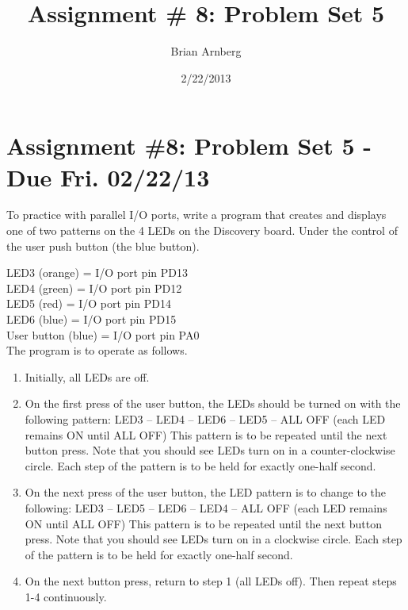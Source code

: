 \documentclass{article}
\title{Assignment \# 8: Problem Set 5}
\date{2/22/2013}
\author{Brian Arnberg}
\begin{document}
\label{start}



\section*{Assignment \#8: Problem Set 5 - Due Fri. 02/22/13}

To practice with parallel I/O ports, write a program that creates and displays one of two patterns
on the 4 LEDs on the Discovery board. Under the control of the user push button (the blue
button).

LED3 (orange) = I/O port pin PD13\\
LED4 (green) = I/O port pin PD12\\
LED5 (red)      = I/O port pin PD14\\
LED6 (blue)     = I/O port pin PD15\\
User button (blue) = I/O port pin PA0\\

The program is to operate as follows.
\begin{enumerate}
	\item Initially, all LEDs are off.
	\item On the first press of the user button, the LEDs should be turned on with the following
        pattern:
        LED3 -- LED4 -- LED6 -- LED5 -- ALL OFF (each LED remains ON until ALL OFF)
        This pattern is to be repeated until the next button press. Note that you should see LEDs
        turn on in a counter-clockwise circle.
        Each step of the pattern is to be held for exactly one-half second.
	\item On the next press of the user button, the LED pattern is to change to the following:
        LED3 -- LED5 -- LED6 -- LED4 -- ALL OFF (each LED remains ON until ALL OFF)
        This pattern is to be repeated until the next button press. Note that you should see LEDs
        turn on in a clockwise circle.
        Each step of the pattern is to be held for exactly one-half second.
	\item On the next button press, return to step 1 (all LEDs off). Then repeat steps 1-4
        continuously.
\end{enumerate}
\end{document}
